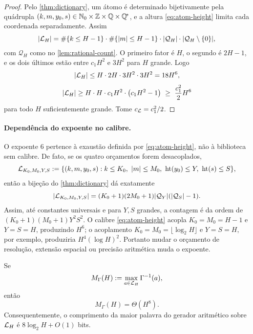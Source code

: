 \begin{proof}
Pelo \cref{thm:dictionary}, um átomo é determinado bijetivamente pela quádrupla $(k,m,y_0,s)\in\mathbb{N}_0\times\mathbb{Z}\times\mathbb{Q}\times\mathbb{Q}^{\!*}$, e a altura \eqref{eq:atom-height} limita cada coordenada separadamente. Assim
\[
 |\mathcal{L}_H|=\#\{k\le H-1\}\cdot\#\{|m|\le H-1\}\cdot|\mathcal{Q}_H|\cdot|\mathcal{Q}_H\setminus\{0\}|,
\]
com $\mathcal{Q}_H$ como no \cref{lem:rational-count}. O primeiro fator é $H$, o segundo é $2H-1$, e os dois últimos estão entre $c_1H^2$ e $3H^2$ para $H$ grande. Logo
\[
 |\mathcal{L}_H|\le H\cdot 2H\cdot 3H^2\cdot 3H^2=18H^6,
\]
\[
 |\mathcal{L}_H|\ge H\cdot H\cdot c_1H^2\cdot\bigl(c_1H^2-1\bigr)\ \ge\ \frac{c_1^2}{2}H^6
\]
para todo $H$ suficientemente grande. Tome $c_{\mathcal{L}}=c_1^2/2$.
\end{proof}

\paragraph{Dependência do expoente no calibre.}
O expoente $6$ pertence à exaustão definida por \eqref{eq:atom-height}, não à
biblioteca sem calibre. De fato, se os quatro orçamentos forem desacoplados,
\[
 \mathcal{L}_{K_0,M_0,Y,S}
 :=\{(k,m,y_0,s):k\le K_0,\ |m|\le M_0,
       \ \operatorname{ht}(y_0)\le Y,\ \operatorname{ht}(s)\le S\},
\]
então a bijeção do \cref{thm:dictionary} dá exatamente
\[
 |\mathcal{L}_{K_0,M_0,Y,S}|
 =(K_0+1)(2M_0+1)|\mathcal Q_Y|
   (|\mathcal Q_S|-1).
\]
Assim, até constantes universais e para $Y,S$ grandes, a contagem é da ordem
de $(K_0+1)(M_0+1)Y^2S^2$. O calibre
\eqref{eq:atom-height} acopla $K_0=M_0=H-1$ e $Y=S=H$, produzindo $H^6$;
o acoplamento $K_0=M_0=\lfloor\log_2H\rfloor$ e $Y=S=H$, por exemplo,
produziria $H^4(\log H)^2$. Portanto mudar o orçamento de resolução, extensão
espacial ou precisão aritmética muda o expoente.

\begin{proposition}
\label{prop:gamma-exact-order}
Se
\[
 M_\Gamma(H):=\max_{a\in\mathcal{L}_H}\Gamma^{-1}(a),
\]
então
\begin{equation}
 M_\Gamma(H)=\Theta(H^8).
 \label{eq:gamma-exact-order}
\end{equation}
Consequentemente, o comprimento da maior palavra do gerador aritmético sobre
$\mathcal{L}_H$ é $8\log_2H+O(1)$ bits.
\end{proposition}

